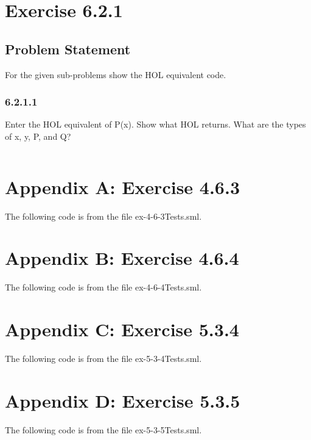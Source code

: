 \documentclass{report}
\begin{document}
\chapter{Exercise 6.2.1}
\label{cha:exercise-6.2.1}

\section{Problem Statement}
\label{sec:problem-statement-5}

For the given sub-problems show the HOL equivalent code.

\subsection{6.2.1.1}
\label{sec:6.2.1.1}

Enter the HOL equivalent of P(x). Show what HOL returns. What are the types of x, y, P, and Q?

\lstset{frameround=tttt}
\begin{lstlisting}[frame=tRBL]

\end{lstlisting}


\chapter{Appendix A: Exercise 4.6.3}
\label{cha:appendix-a:-exercise463}

The following code is from the file ex-4-6-3Tests.sml.


\chapter{Appendix B: Exercise 4.6.4}
\label{cha:appendix-a:-exercise464}

The following code is from the file ex-4-6-4Tests.sml.


\chapter{Appendix C: Exercise 5.3.4}
\label{cha:appendix-a:-exercise534}

The following code is from the file ex-5-3-4Tests.sml.


\chapter{Appendix D: Exercise 5.3.5}
\label{cha:appendix-a:-exercise535}

The following code is from the file ex-5-3-5Tests.sml.

\end{document}

